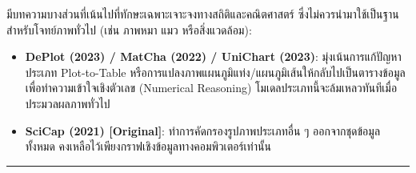 \documentclass[10pt,a4paper]{article}
\begin{document}
มีบทความบางส่วนที่เน้นไปที่ทักษะเฉพาะเจาะจงทางสถิติและคณิตศาสตร์ ซึ่งไม่ควรนำมาใช้เป็นฐานสำหรับโจทย์ภาพทั่วไป (เช่น ภาพหมา แมว หรือสิ่งแวดล้อม):
\begin{itemize}[nosep]
  \item \textbf{DePlot (2023) / MatCha (2022) / UniChart (2023)}: มุ่งเน้นการแก้ปัญหาประเภท Plot-to-Table หรือการแปลงภาพแผนภูมิแท่ง/แผนภูมิเส้นให้กลับไปเป็นตารางข้อมูลเพื่อทำความเข้าใจเชิงตัวเลข (Numerical Reasoning) โมเดลประเภทนี้จะล้มเหลวทันทีเมื่อประมวลผลภาพทั่วไป
  \item \textbf{SciCap (2021) [Original]}: ทำการคัดกรองรูปภาพประเภทอื่น ๆ ออกจากชุดข้อมูลทั้งหมด คงเหลือไว้เพียงกราฟเชิงข้อมูลทางคอมพิวเตอร์เท่านั้น
\end{itemize}

\vspace{16pt}
\noindent\rule{\textwidth}{1pt}
\end{document}
